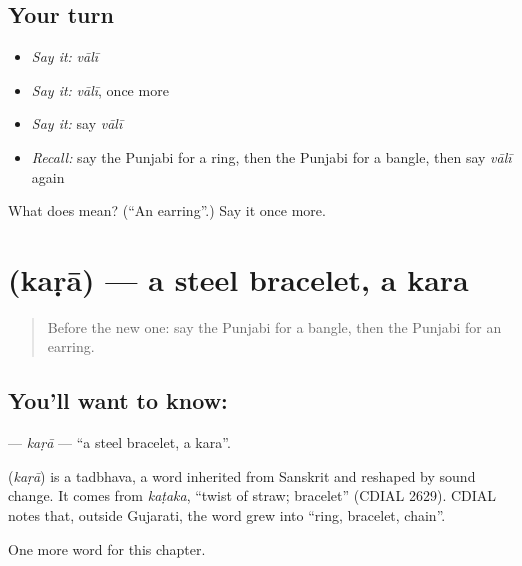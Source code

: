 \subsection*{Your turn}
\begin{itemize}
\raggedright
  \item \emph{Say it:} \emph{vālī}
  \item \emph{Say it:} \emph{vālī}, once more
  \item \emph{Say it:} say \emph{vālī}
  \item \emph{Recall:} say the Punjabi for a ring, then the Punjabi for a bangle, then say \emph{vālī} again
\end{itemize}

\begin{tcolorbox}[breakable,colback=teal!4,colframe=teal!35!black,title={Before you move on}]
What does  mean? (\textquotedblleft{}An earring\textquotedblright{}.) Say it once more.
\end{tcolorbox}
\section[\texorpdfstring{\pa{ਕੜਾ} (kaṛā)}{ਕੜਾ (kaṛā)}]{ (kaṛā) — a steel bracelet, a kara}

\label{lesson:PA-C121-kara}



\begin{quote}
Before the new one: say the Punjabi for a bangle, then the Punjabi for an earring.
\end{quote}

\subsection*{You'll want to know: }
\textbf{} — \emph{kaṛā} — \textquotedblleft{}a steel bracelet, a kara\textquotedblright{}.

\begin{cousinweb}
\textbf{} (\emph{kaṛā}) is a tadbhava, a word inherited from Sanskrit and reshaped by sound change. It comes from \emph{kaṭaka}, \textquotedblleft{}twist of straw; bracelet\textquotedblright{} (CDIAL 2629). CDIAL notes that, outside Gujarati, the word grew into \textquotedblleft{}ring, bracelet, chain\textquotedblright{}.
\end{cousinweb}

\begin{grammarlens}[title={What you've built}]
One more word for this chapter.
\end{grammarlens}

